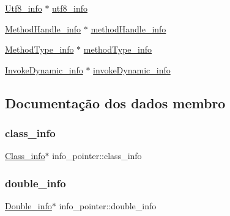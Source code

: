 \begin{DoxyCompactItemize}
\item 
\hyperlink{struct_utf8__info}{Utf8\+\_\+info} $\ast$ \hyperlink{unioninfo__pointer_a7a08700f711c4dbc7cbfeadb6b8fa4c2}{utf8\+\_\+info}
\item 
\hyperlink{struct_method_handle__info}{Method\+Handle\+\_\+info} $\ast$ \hyperlink{unioninfo__pointer_aded37473be29ff4ed1b1b6acbeb869f6}{method\+Handle\+\_\+info}
\item 
\hyperlink{struct_method_type__info}{Method\+Type\+\_\+info} $\ast$ \hyperlink{unioninfo__pointer_a87ced2262cbee8291ed014fe299c0aeb}{method\+Type\+\_\+info}
\item 
\hyperlink{struct_invoke_dynamic__info}{Invoke\+Dynamic\+\_\+info} $\ast$ \hyperlink{unioninfo__pointer_a17bd96c4e69cb0ccc7ea002320498e5c}{invoke\+Dynamic\+\_\+info}
\end{DoxyCompactItemize}


\subsection{Documentação dos dados membro}
\hypertarget{unioninfo__pointer_a2503ced8dac13ac48042f8b88d39cad1}{}\label{unioninfo__pointer_a2503ced8dac13ac48042f8b88d39cad1} 
\subsubsection{\texorpdfstring{class\+\_\+info}{class\_info}}
{\footnotesize\ttfamily \hyperlink{struct_class__info}{Class\+\_\+info}$\ast$ info\+\_\+pointer\+::class\+\_\+info}

\hypertarget{unioninfo__pointer_a9609953889d0cb1fd1b2909cb98eb573}{}\label{unioninfo__pointer_a9609953889d0cb1fd1b2909cb98eb573} 
\subsubsection{\texorpdfstring{double\+\_\+info}{double\_info}}
{\footnotesize\ttfamily \hyperlink{struct_double__info}{Double\+\_\+info}$\ast$ info\+\_\+pointer\+::double\+\_\+info}

\hypertarget{unioninfo__pointer_a85482dc8d14195f18c1de44d2dc833e7}{}\label{unioninfo__pointer_a85482dc8d14195f18c1de44d2dc833e7} 
